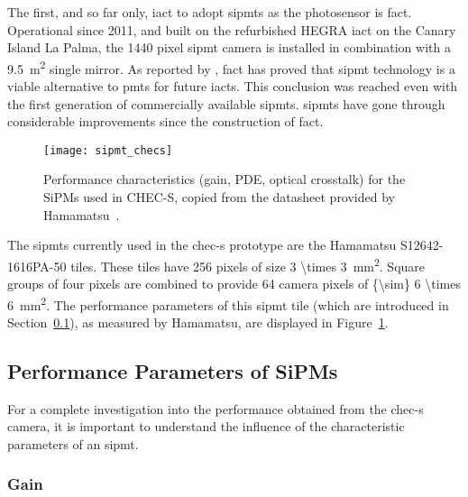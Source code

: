 The first, and so far only, \gls{iact} to adopt \glspl{sipmt} as the photosensor is \gls{fact}. Operational since 2011, and built on the refurbished
HEGRA \gls{iact} on the Canary Island La Palma, the 1440 pixel \gls{sipmt} camera is installed in combination with a \SI{9.5}{m\squared} single mirror. As reported by \textcite{Biland2015}, \gls{fact} has proved that \gls{sipmt} technology is a viable alternative to \glspl{pmt} for future \glspl{iact}. This conclusion was reached even with the first generation of commercially available \glspl{sipmt}. \glspl{sipmt} have gone through considerable improvements since the construction of \gls{fact}.

\begin{figure}
	\centering
    \texttt{[image: sipmt\_checs]} 
	\caption[Performance characteristics for the SiPMs used in CHEC-S.]{Performance characteristics (gain, PDE, optical crosstalk) for the SiPMs used in CHEC-S, copied from the datasheet provided by Hamamatsu~\cite{Hamamatsu2013}.}
	\label{fig:sipmt_checs}
\end{figure}

The \glspl{sipmt} currently used in the \gls{chec-s} prototype are the Hamamatsu S12642-1616PA-50 tiles. These tiles have 256 pixels of size \SI[parse-numbers = false]{3 \times 3}{mm\squared}. Square groups of four pixels are combined to provide 64 camera pixels of \SI[parse-numbers = false]{{\sim} 6 \times 6}{mm\squared}. The performance parameters of this \gls{sipmt} tile (which are introduced in Section~\ref{section:sipmt_parameters}), as measured by Hamamatsu, are displayed in Figure~\ref{fig:sipmt_checs}.

\subsection{Performance Parameters of SiPMs} \label{section:sipmt_parameters}

For a complete investigation into the performance obtained from the \gls{chec-s} camera, it is important to understand the influence of the characteristic parameters of an \gls{sipmt}.

\subsubsection{Gain}

